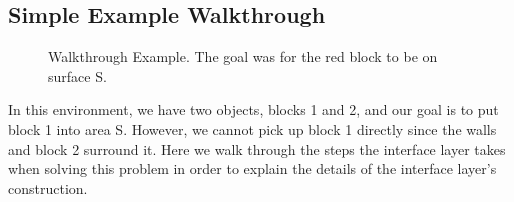 \documentclass[12pt]{article}
\begin{document}
\subsection{Simple Example Walkthrough}

\begin{figure}[t]
\centering
\def\svgwidth{0.5\textwidth}

\caption{Walkthrough Example. The goal was for the red block to be on surface S.\label{fig:walkthrough}}
\end{figure}

In this environment, we have two objects, blocks 1 and 2, and our goal is to put block 1 into area S.  
However, we cannot pick up block 1 directly since the walls and block 2 surround it.  
Here we walk through the steps the interface layer takes when solving this problem in order to explain the details of the interface layer's construction.
\end{document}
